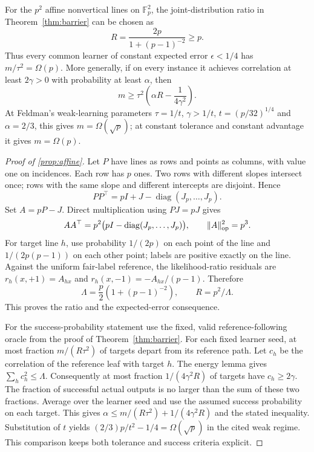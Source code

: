 \begin{proposition}\label{prop:affine}
For the $p^2$ affine nonvertical lines on $\mathbb F_p^2$, the joint-distribution ratio in Theorem~\ref{thm:barrier} can be chosen as
\[
 R=\frac{2p}{1+(p-1)^{-2}}\ge p.
\]
Thus every common learner of constant expected error $\epsilon<1/4$ has $m/\tau^2=\Omega(p)$. More generally, if on every instance it achieves correlation at least $2\gamma>0$ with probability at least $\alpha$, then
\[
 m\ge\tau^2\left(\alpha R-\frac1{4\gamma^2}\right).
\]
At Feldman's weak-learning parameters $\tau=1/t$, $\gamma>1/t$, $t=(p/32)^{1/4}$ and $\alpha=2/3$, this gives $m=\Omega(\sqrt p)$; at constant tolerance and constant advantage it gives $m=\Omega(p)$.
\end{proposition}

\begin{proof}[Proof of \cref{prop:affine}]
Let $P$ have lines as rows and points as columns, with value one on incidences. Each row has $p$ ones. Two rows with different slopes intersect once; rows with the same slope and different intercepts are disjoint. Hence
\[
 PP^\top=pI+J-\operatorname{diag}(J_p,\ldots,J_p).
\]
Set $A=pP-J$. Direct multiplication using $PJ=pJ$ gives
\[
 AA^\top=p^2\bigl(pI-\operatorname{diag}(J_p,\ldots,J_p)\bigr),
 \qquad \|A\|_{\rm op}^2=p^3.
\]
For target line $h$, use probability $1/(2p)$ on each point of the line and $1/(2p(p-1))$ on each other point; labels are positive exactly on the line. Against the uniform fair-label reference, the likelihood-ratio residuals are $r_h(x,+1)=A_{hx}$ and $r_h(x,-1)=-A_{hx}/(p-1)$. Therefore
\[
 \Lambda=\frac p2(1+(p-1)^{-2}),\qquad R=p^2/\Lambda.
\]
This proves the ratio and the expected-error consequence.

For the success-probability statement use the fixed, valid reference-following oracle from the proof of Theorem~\ref{thm:barrier}. For each fixed learner seed, at most fraction $m/(R\tau^2)$ of targets depart from its reference path. Let $c_h$ be the correlation of the reference leaf with target $h$. The energy lemma gives $\sum_hc_h^2\le\Lambda$. Consequently at most fraction $1/(4\gamma^2R)$ of targets have $c_h\ge2\gamma$. The fraction of successful actual outputs is no larger than the sum of these two fractions. Average over the learner seed and use the assumed success probability on each target. This gives $\alpha\le m/(R\tau^2)+1/(4\gamma^2R)$ and the stated inequality. Substitution of $t$ yields $(2/3)p/t^2-1/4=\Omega(\sqrt p)$ in the cited weak regime. This comparison keeps both tolerance and success criteria explicit.
\end{proof}
